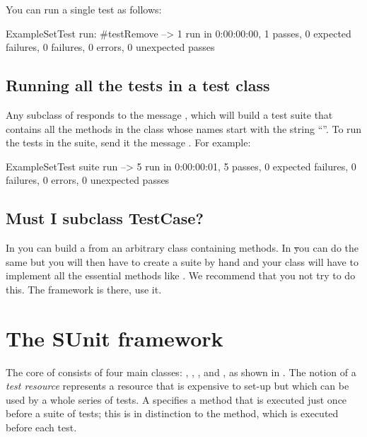 \documentclass[a4paper,10pt,twoside]{book}
\begin{document}
You can run a single test as follows:

\begin{code}{}
ExampleSetTest run: #testRemove --> 1 run in 0:00:00:00, 1 passes, 0 expected failures, 0 failures, 0 errors, 0 unexpected passes
\end{code}

\subsection{Running all the tests in a test class}

Any subclass of  responds to the message , which will build a test suite that contains all the methods in the class whose names start with the string ``''.
To run the tests in the suite, send it the message .
For example:

\begin{code}{}
ExampleSetTest suite run --> 5 run in 0:00:00:01, 5 passes, 0 expected failures, 0 failures, 0 errors, 0 unexpected passes
\end{code}

\subsection{Must I subclass TestCase?}

In \JUnit{} you can build a  from an arbitrary class containing  methods.
In \st you can do the same but you will then have to create a suite by hand and your class will have to implement all the essential  methods like .
We recommend that you not try to do this.
The framework is there, use it.
\section{The SUnit framework}

The core of \sunit consists of four main classes: , , , and , as shown in .
The notion of a \emph{test resource} represents a resource that is expensive to set-up but which can be used by a whole series of tests.  A  specifies a  method that is executed just once before a suite of tests; this is in distinction to the  method, which is executed before each test.
\end{document}
